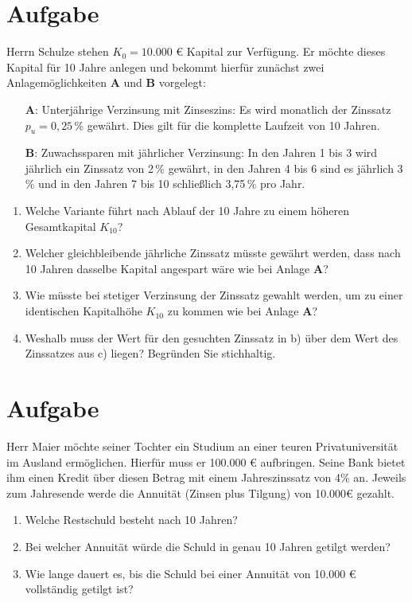 \documentclass[fontsize=11pt, parskip=half]{scrartcl}
\begin{document}
    
    \section{Aufgabe}
    Herrn Schulze stehen $K_0 = 10.000$ € Kapital zur
    Verfügung. Er möchte dieses Kapital für 10 Jahre anlegen und bekommt
    hierfür zunächst zwei Anlagemöglichkeiten \textbf{A} und \textbf{B}
    vorgelegt:
    \begin{itemize}
    \item[\textbf{A}:] Unterjährige Verzinsung mit Zinseszins: Es wird monatlich der Zinssatz $p_u=0,25$\,\% gewährt. Dies gilt für die komplette Laufzeit von 10 Jahren.
    \item[\textbf{B}:] Zuwachssparen mit jährlicher Verzinsung: In den
    Jahren 1 bis 3 wird jährlich ein Zinssatz von 2\,\% gewährt, in den
    Jahren 4 bis 6 sind es jährlich 3\,\% und in den Jahren 7 bis 10
    schlie{\ss}lich 3,75\,\% pro Jahr.
    \end{itemize}
    
    \begin{enumerate}
    \item Welche Variante führt nach Ablauf der 10 Jahre zu einem höheren Gesamtkapital $K_{10}$?
    \item Welcher gleichbleibende jährliche Zinssatz müsste gewährt werden, dass nach 10 Jahren dasselbe Kapital angespart wäre wie bei Anlage \textbf{A}?
    \item Wie müsste bei stetiger Verzinsung der Zinssatz gewahlt werden, um zu einer identischen Kapitalhöhe $K_{10}$ zu kommen wie bei Anlage \textbf{A}?
    \item Weshalb muss der Wert für den gesuchten Zinssatz in b) über dem Wert des Zinssatzes aus c) liegen? Begründen Sie stichhaltig.\\
    \end{enumerate}
    

    
    \section{Aufgabe}
    Herr Maier möchte seiner Tochter ein Studium an einer teuren
    Privatuniversität im Ausland ermöglichen. Hierfür muss er 100.000
   € aufbringen. Seine Bank bietet ihm einen Kredit über diesen
    Betrag mit einem Jahreszinssatz von 4\% an. Jeweils zum Jahresende
    werde die Annuität (Zinsen plus Tilgung) von 10.000€ gezahlt.
    \begin{enumerate}
    \item Welche Restschuld besteht nach 10 Jahren? %
    \item Bei welcher Annuität würde die Schuld in genau 10 Jahren
    getilgt werden?
    \item Wie lange dauert es, bis die Schuld bei einer Annuität von 10.000 € vollständig getilgt
    ist?
    \end{enumerate}
    
\end{document}
